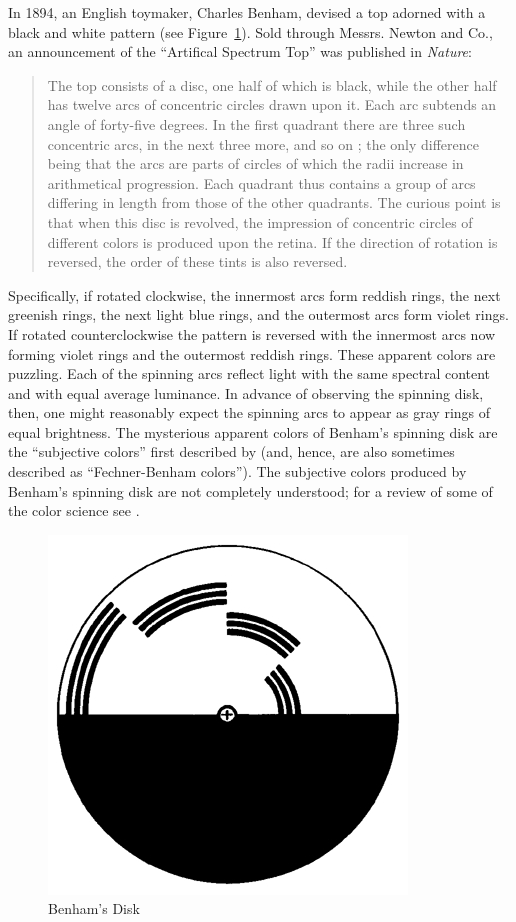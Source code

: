 \documentclass[12pt]{article}
\begin{document}
In 1894, an English toymaker, Charles Benham, devised a top adorned with a black and white pattern (see Figure~\ref{fig:benham}). Sold through Messrs. Newton and Co., an announcement of the ``Artifical Spectrum Top'' was published in \emph{Nature}:
\begin{quote}
	The top consists of a disc, one half of which is black, while the other half has twelve arcs of concentric circles drawn upon it. Each arc subtends an angle of forty-five degrees. In the first quadrant there are three such concentric arcs, in the next three more, and so on ; the only difference being that the arcs are parts of circles of which the radii increase in arithmetical progression. Each quadrant thus contains a group of arcs differing in length from those of the other quadrants. The curious point is that when this disc is revolved, the impression of concentric circles of different colors is produced upon the retina. If the direction of rotation is reversed, the order of these tints is also reversed. \citep{Benham:1894kx}
\end{quote}
Specifically, if rotated clockwise, the innermost arcs form reddish rings, the next greenish rings, the next light blue rings, and the outermost arcs form violet rings. If rotated counterclockwise the pattern is reversed with the innermost arcs now forming violet rings and the outermost reddish rings. These apparent colors are puzzling. Each of the spinning arcs reflect light with the same spectral content and with equal average luminance. In advance of observing the spinning disk, then, one might reasonably expect the spinning arcs to appear as gray rings of equal brightness. The mysterious apparent colors of Benham's spinning disk are the ``subjective colors'' first described by \citep{Fechner:1838vn} (and, hence, are also sometimes described as ``Fechner-Benham colors''). The subjective colors produced by Benham's spinning disk are not completely understood; for a review of some of the color science see \citet{Campenhausen:1995yq}.

\begin{figure}[htbp]
	\centering
		\includegraphics[scale=.5]{graphics/benhams_disk.jpg}
	\caption{Benham's Disk}
	\label{fig:benham}
\end{figure}
\end{document}
